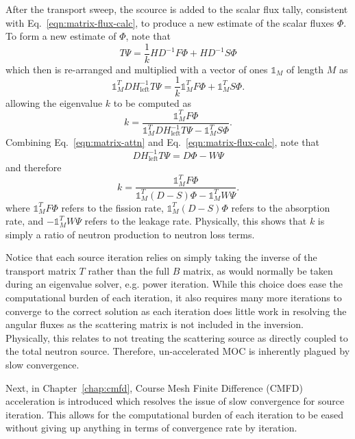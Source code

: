 After the transport sweep, the scource is added to the scalar flux tally, consistent with Eq.~\ref{eqn:matrix-flux-calc}, to produce a new estimate of the scalar fluxes $\Phi$. To form a new estimate of $\Phi$, note that
\begin{equation}
T \Psi = \frac{1}{k} H D^{-1} F \Phi + H D^{-1} S \Phi
\end{equation}
which then is re-arranged and multiplied with a vector of ones $\mathbb{1}_M$ of length $M$ as
\begin{equation}
\mathbb{1}_M^T D H_{\text{left}}^{-1} T \Psi  = \frac{1}{k} \mathbb{1}_M^T  F \Phi + \mathbb{1}_M^T  S \Phi.
\end{equation}
allowing the eigenvalue $k$ to be computed as
\begin{equation}
k = \frac{\mathbb{1}_M^T F \Phi}{\mathbb{1}_M^T  D H_{\text{left}}^{-1} T \Psi - \mathbb{1}_M^T S \Phi}.
\end{equation}
Combining Eq.~\ref{eqn:matrix-attn} and Eq.~\ref{eqn:matrix-flux-calc}, note that
\begin{equation}
D H_{\text{left}}^{-1} T \Psi = D \Phi - W \Psi
\end{equation}
and therefore
\begin{equation}
k = \frac{\mathbb{1}_M^T F \Phi}{\mathbb{1}_M^T \left(D - S \right) \Phi - \mathbb{1}_M^T W \Psi}.
\end{equation}
where $\mathbb{1}_M^T F \Phi$ refers to the fission rate, $\mathbb{1}_M^T \left(D - S \right) \Phi$ refers to the absorption rate, and $-\mathbb{1}_M^T W \Psi$ refers to the leakage rate. Physically, this shows that $k$ is simply a ratio of neutron production to neutron loss terms.

Notice that each source iteration relies on simply taking the inverse of the transport matrix $T$ rather than the full $B$ matrix, as would normally be taken during an eigenvalue solver, e.g. power iteration. While this choice does ease the computational burden of each iteration, it also requires many more iterations to converge to the correct solution as each iteration does little work in resolving the angular fluxes as the scattering matrix is not included in the inversion. Physically, this relates to not treating the scattering source as directly coupled to the total neutron source. Therefore, un-accelerated MOC is inherently plagued by slow convergence. 

Next, in Chapter~\ref{chap:cmfd}, Course Mesh Finite Difference (CMFD) acceleration is introduced which resolves the issue of slow convergence for source iteration. This allows for the computational burden of each iteration to be eased without giving up anything in terms of convergence rate by iteration.

